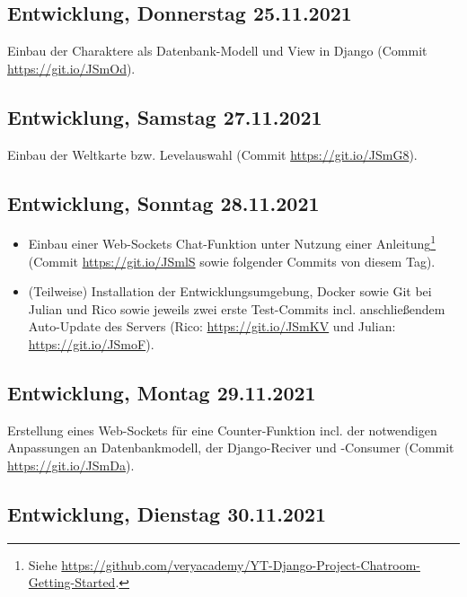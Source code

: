 \subsection{Entwicklung, Donnerstag 25.11.2021}

Einbau der Charaktere als Datenbank-Modell und View in Django (Commit \url{https://git.io/JSmOd}).



\subsection{Entwicklung, Samstag 27.11.2021}

Einbau der Weltkarte bzw. Levelauswahl (Commit \url{https://git.io/JSmG8}).



\subsection{Entwicklung, Sonntag 28.11.2021}

\begin{itemize}
    \item Einbau einer Web-Sockets Chat-Funktion unter Nutzung einer Anleitung\footnote{Siehe \url{https://github.com/veryacademy/YT-Django-Project-Chatroom-Getting-Started}. } (Commit \url{https://git.io/JSmlS} sowie folgender Commits von diesem Tag).
    \item (Teilweise) Installation der Entwicklungsumgebung, Docker sowie Git bei Julian und Rico sowie jeweils zwei erste Test-Commits incl. anschließendem Auto-Update des Servers (Rico: \url{https://git.io/JSmKV} und Julian: \url{https://git.io/JSmoF}).
\end{itemize}



\subsection{Entwicklung, Montag 29.11.2021}

Erstellung eines Web-Sockets für eine Counter-Funktion incl. der notwendigen Anpassungen an Datenbankmodell, der Django-Reciver und -Consumer (Commit \url{https://git.io/JSmDa}).



\subsection{Entwicklung, Dienstag 30.11.2021}

